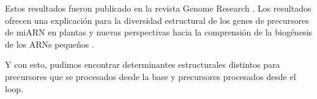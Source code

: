 Estos resultados fueron publicado en la revista Genome Research \citep{Bologna2013}.
Los resultados ofrecen una explicación para la diversidad estructural de los genes de precursores de miARN en plantas y nuevas perspectivas hacia la comprensión de la biogénesis de los ARNs pequeños \citep{Bologna2013}.

Y con esto, pudimos encontrar determinantes estructurales distintos para precursores que se procesados desde la base y precursores procesados desde el loop. 
